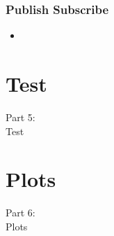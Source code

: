 \begin{frame}
    \frametitle{Publish Subscribe}
    \begin{itemize}
      \item 
    \end{itemize}
\end{frame}

\section{Test}
\begin{frame}
    \vspace{25mm}
    \begin{center}
        \Huge{Part 5:\\Test}
    \end{center}
\end{frame}

\section{Plots}
\begin{frame}
    \vspace{25mm}
    \begin{center}
        \Huge{Part 6:\\Plots}
    \end{center}
\end{frame}

